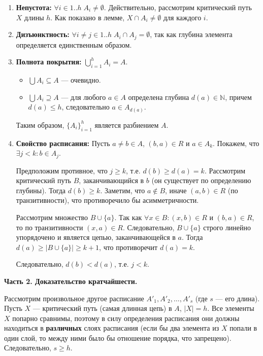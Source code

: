 \documentclass[a4paper,12pt]{article}
\begin{document}
	\begin{enumerate}
		\item \textbf{Непустота:} $\forall i \in 1..h \; A_i \neq \emptyset$. Действительно, рассмотрим критический путь $X$ длины $h$. Как показано в лемме, $X \cap A_i \neq \emptyset$ для каждого $i$.
		
		\item \textbf{Дизъюнктность:} $\forall i \neq j \in 1..h \; A_i \cap A_j = \emptyset$, так как глубина элемента определяется единственным образом.
		
		\item \textbf{Полнота покрытия:} $\bigcup_{i=1}^{h} A_i = A$.
		\begin{itemize}
			\item $\bigcup A_i \subseteq A$ — очевидно.
			\item $\bigcup A_i \supseteq A$ — для любого $a \in A$ определена глубина $d(a) \in \mathbb{N}$, причем $d(a) \le h$, следовательно $a \in A_{d(a)}$.
		\end{itemize}
		Таким образом, $\{A_i\}_{i=1}^{h}$ является разбиением $A$.
		
		\item \textbf{Свойство расписания:} Пусть $a \neq b \in A$, $(b,a) \in R$ и $a \in A_k$. Покажем, что $\exists j < k: b \in A_j$.
		
		Предположим противное, что $j \ge k$, т.е. $d(b) \ge d(a) = k$. Рассмотрим критический путь $B$, заканчивающийся в $b$ (он существует по определению глубины). Тогда $d(b) \ge k$. Заметим, что $a \notin B$, иначе $(a,b) \in R$ (по транзитивности), что противоречило бы асимметричности.
		
		Рассмотрим множество $B \cup \{a\}$. Так как $\forall x \in B: (x,b) \in R$ и $(b,a) \in R$, то по транзитивности $(x,a) \in R$. Следовательно, $B \cup \{a\}$ строго линейно упорядочено и является цепью, заканчивающейся в $a$. Тогда $d(a) \ge |B \cup \{a\}| \ge k + 1$, что противоречит $d(a) = k$.
		
		Следовательно, $d(b) < d(a)$, т.е. $j < k$.
	\end{enumerate}
	
	\textbf{Часть 2. Доказательство кратчайшести.}
	
	Рассмотрим произвольное другое расписание $A'_1, A'_2, \dots, A'_s$ (где $s$ — его длина). Пусть $X$ — критический путь (самая длинная цепь) в $A$, $|X| = h$. Все элементы $X$ попарно сравнимы, поэтому в силу определения расписания они должны находиться в \textbf{различных} слоях расписания (если бы два элемента из $X$ попали в один слой, то между ними было бы отношение порядка, что запрещено). Следовательно, $s \ge h$.
	
\end{document}
